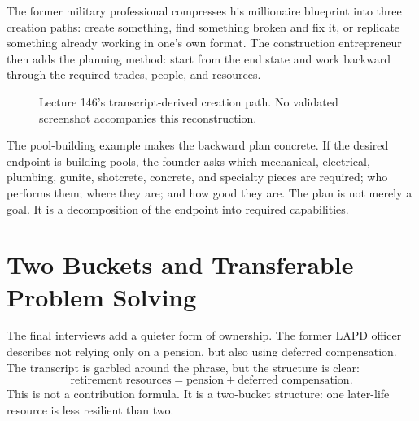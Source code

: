 \documentclass[11pt,oneside]{book}
\begin{document}
The former military professional compresses his millionaire blueprint into three creation paths: create something, find something broken and fix it, or replicate something already working in one's own format. The construction entrepreneur then adds the planning method: start from the end state and work backward through the required trades, people, and resources.

\begin{figure}
\centering
{}
\caption{Lecture 146's transcript-derived creation path. No validated screenshot accompanies this reconstruction.}
\end{figure}

The pool-building example makes the backward plan concrete. If the desired endpoint is building pools, the founder asks which mechanical, electrical, plumbing, gunite, shotcrete, concrete, and specialty pieces are required; who performs them; where they are; and how good they are. The plan is not merely a goal. It is a decomposition of the endpoint into required capabilities.

\section{Two Buckets and Transferable Problem Solving}

The final interviews add a quieter form of ownership. The former LAPD officer describes not relying only on a pension, but also using deferred compensation. The transcript is garbled around the phrase, but the structure is clear:
\[
\text{retirement resources}
=
\text{pension}
+
\text{deferred compensation}.
\]
This is not a contribution formula. It is a two-bucket structure: one later-life resource is less resilient than two.
\end{document}
